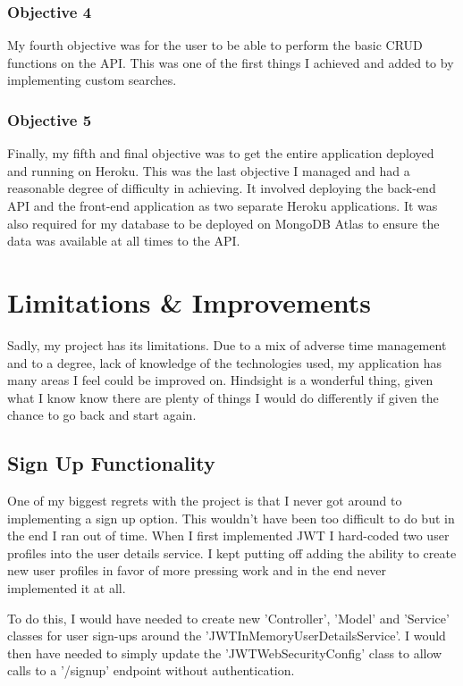 \subsubsection{Objective 4}
My fourth objective was for the user to be able to perform the basic CRUD functions on the API. This was one of the first things I achieved and added to by implementing custom searches.

\subsubsection{Objective 5}
Finally, my fifth and final objective was to get the entire application deployed and running on Heroku. This was the last objective I managed and had a reasonable degree of difficulty in achieving. It involved deploying the back-end API and the front-end application as two separate Heroku applications. It was also required for my database to be deployed on MongoDB Atlas to ensure the data was available at all times to the API.

\section{Limitations \& Improvements}
Sadly, my project has its limitations. Due to a mix of adverse time management and to a degree, lack of knowledge of the technologies used, my application has many areas I feel could be improved on. Hindsight is a wonderful thing, given what I know know there are plenty of things I would do differently if given the chance to go back and start again.

\subsection{Sign Up Functionality}
One of my biggest regrets with the project is that I never got around to implementing a sign up option. This wouldn't have been too difficult to do but in the end I ran out of time. When I first implemented JWT I hard-coded two user profiles into the user details service. I kept putting off adding the ability to create new user profiles in favor of more pressing work and in the end never implemented it at all.

To do this, I would have needed to create new 'Controller', 'Model' and 'Service' classes for user sign-ups around the 'JWTInMemoryUserDetailsService'. I would then have needed to simply update the 'JWTWebSecurityConfig' class to allow calls to a '/signup' endpoint without authentication.

